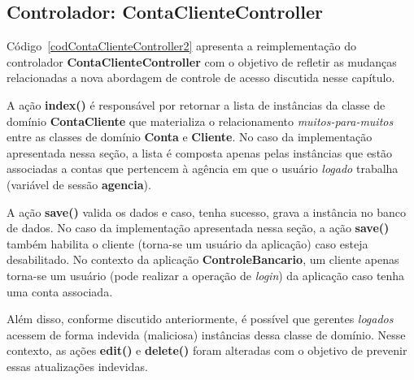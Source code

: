 \subsection{Controlador: ContaClienteController}

\vspace{0.5cm}

Código~\ref{codContaClienteController2}    apresenta   a    reimplementação   do
controlador {\bf ContaClienteController} com o objetivo de refletir as mudanças
relacionadas a nova abordagem de controle de acesso discutida nesse capítulo.  

A ação {\bf index()} é responsável  por retornar a lista de instâncias da classe
de   domínio  {\bf   ContaCliente}   que  materializa   o  relacionamento   {\em
  muitos-para-muitos}  entre   as  classes  de   domínio  {\bf  Conta}   e  {\bf
  Cliente}.   No  caso da  implementação  apresentada  nessa  seção, a  lista  é
composta apenas pelas  instâncias que estão associadas a  contas que pertencem à
agência  em  que  o usuário  {\it  logado}  trabalha  (variável de  sessão  {\bf
  agencia}).  

A ação {\bf save()} valida os dados  e caso, tenha sucesso, grava a instância no
banco de  dados. No caso da  implementação apresentada nessa seção,  a ação {\bf
  save()}  também habilita  o cliente  (torna-se um  usuário da  aplicação) caso
esteja desabilitado. No contexto da aplicação {\bf ControleBancario}, um cliente
apenas  torna-se  um  usuário (pode  realizar  a  operação  de {\it  login})  da
aplicação caso tenha uma conta associada. 

Além  disso, conforme  discutido  anteriormente, é  possível  que gerentes  {\it
  logados}  acessem de  forma indevida  (maliciosa) instâncias  dessa  classe de
domínio.  Nesse contexto, as ações {\bf edit()} e {\bf delete()} foram alteradas
com o objetivo de prevenir essas atualizações indevidas. 

